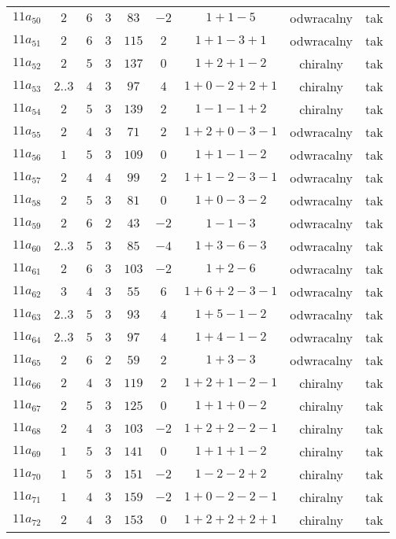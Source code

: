 \begin{longtable}{ccccccccc}
$11a_{50}$ & $2$ & $6$ & $3$ & $83$ & $-2$ & $1+1-5$ & odwracalny & tak \\
$11a_{51}$ & $2$ & $6$ & $3$ & $115$ & $2$ & $1+1-3+1$ & odwracalny & tak \\
$11a_{52}$ & $2$ & $5$ & $3$ & $137$ & $0$ & $1+2+1-2$ & chiralny & tak \\
$11a_{53}$ & $2..3$ & $4$ & $3$ & $97$ & $4$ & $1+0-2+2+1$ & chiralny & tak \\
$11a_{54}$ & $2$ & $5$ & $3$ & $139$ & $2$ & $1-1-1+2$ & chiralny & tak \\
$11a_{55}$ & $2$ & $4$ & $3$ & $71$ & $2$ & $1+2+0-3-1$ & odwracalny & tak \\
$11a_{56}$ & $1$ & $5$ & $3$ & $109$ & $0$ & $1+1-1-2$ & odwracalny & tak \\
$11a_{57}$ & $2$ & $4$ & $4$ & $99$ & $2$ & $1+1-2-3-1$ & odwracalny & tak \\
$11a_{58}$ & $2$ & $5$ & $3$ & $81$ & $0$ & $1+0-3-2$ & odwracalny & tak \\
$11a_{59}$ & $2$ & $6$ & $2$ & $43$ & $-2$ & $1-1-3$ & odwracalny & tak \\
$11a_{60}$ & $2..3$ & $5$ & $3$ & $85$ & $-4$ & $1+3-6-3$ & odwracalny & tak \\
$11a_{61}$ & $2$ & $6$ & $3$ & $103$ & $-2$ & $1+2-6$ & odwracalny & tak \\
$11a_{62}$ & $3$ & $4$ & $3$ & $55$ & $6$ & $1+6+2-3-1$ & odwracalny & tak \\
$11a_{63}$ & $2..3$ & $5$ & $3$ & $93$ & $4$ & $1+5-1-2$ & odwracalny & tak \\
$11a_{64}$ & $2..3$ & $5$ & $3$ & $97$ & $4$ & $1+4-1-2$ & odwracalny & tak \\
$11a_{65}$ & $2$ & $6$ & $2$ & $59$ & $2$ & $1+3-3$ & odwracalny & tak \\
$11a_{66}$ & $2$ & $4$ & $3$ & $119$ & $2$ & $1+2+1-2-1$ & chiralny & tak \\
$11a_{67}$ & $2$ & $5$ & $3$ & $125$ & $0$ & $1+1+0-2$ & chiralny & tak \\
$11a_{68}$ & $2$ & $4$ & $3$ & $103$ & $-2$ & $1+2+2-2-1$ & chiralny & tak \\
$11a_{69}$ & $1$ & $5$ & $3$ & $141$ & $0$ & $1+1+1-2$ & chiralny & tak \\
$11a_{70}$ & $1$ & $5$ & $3$ & $151$ & $-2$ & $1-2-2+2$ & chiralny & tak \\
$11a_{71}$ & $1$ & $4$ & $3$ & $159$ & $-2$ & $1+0-2-2-1$ & chiralny & tak \\
$11a_{72}$ & $2$ & $4$ & $3$ & $153$ & $0$ & $1+2+2+2+1$ & chiralny & tak \\

\end{longtable}
